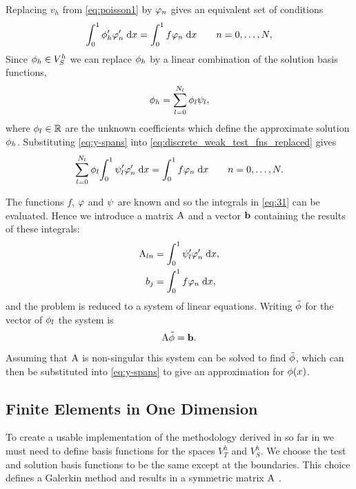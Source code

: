 {Replacing $v_{h}$ from \cref{eq:poisson1} by $\varphi_{n}$ gives an equivalent set of conditions
\begin{equation}
  {\int_0^1   \phi'_{h} \varphi_{n}'   {\; \mathrm{{d}}}{x}}  = {\int_0^1  f\varphi_{n}  {\; \mathrm{{d}}}{x}} \qquad n=0,\ldots,N,
  \label{eq:discrete_weak_test_fns_replaced}
\end{equation}
Since $\phi_{h}\in V_{S}^{h}$ we can replace $\phi_{h}$ by a linear combination of the solution basis functions, \ie
\begin{equation}
  \phi_{h}=\sum_{l=0}^{N_l} \phi_{l}\psi_{l},
  \label{eq:y-spans}
\end{equation}
where $\phi_l \in \mathbb{R}$ are the unknown coefficients which define the approximate solution ${\phi}_h$.
Substituting \cref{eq:y-spans} into \cref{eq:discrete_weak_test_fns_replaced} gives
\begin{equation}
  \sum_{l=0}^{N_l} \phi_{l}{\int_0^1  \psi_{l}'\varphi'_{n}  {\; \mathrm{{d}}}{x}} ={\int_0^1  f\varphi_{n}  {\; \mathrm{{d}}}{x}}
  \qquad n=0,\ldots,N.
  \label{eq:31}
\end{equation}

The functions $f$, $\varphi$ and $\psi$ are known and so the integrals in \cref{eq:31} can be evaluated.
Hence we introduce a matrix $\mathrm{A}$ and a vector ${\boldsymbol{\mathrm{b}}}$ containing the results of these integrals:
\begin{equation}
  \begin{aligned}
    \mathrm{A}_{ln} &= {\int_0^1  \psi_{l}'\varphi'_{n}  {\; \mathrm{{d}}}{x}}, \\
    b_{j} &= {\int_0^1  f\varphi_{n}  {\; \mathrm{{d}}}{x}}, \\
    \label{eq:Aij_bj}
  \end{aligned}
\end{equation}
and the problem is reduced to a system of linear equations.
Writing $\tilde{\phi}$ for the vector of $\phi_l$ the system is
\begin{equation}
  \mathrm{A} \tilde{\phi} = {\boldsymbol{\mathrm{b}}}.
  \label{eq:final_galerkin}
\end{equation}
Assuming that $\mathrm{A}$ is non-singular this system can be solved to find $\tilde{\phi}$, which can then be substituted into \cref{eq:y-spans} to give an approximation for $\phi(x)$.


\subsection{Finite Elements in One Dimension}
\label{sub:Actual-Finite-Elements}

To create a usable implementation of the methodology derived in so far in  we must need to define basis functions for the spaces $V_{T}^{h}$ and $V_S^h$.
We choose the test and solution basis functions to be the same except at the boundaries.
This choice defines a Galerkin method and results in a symmetric matrix $\mathrm{A}$ \cite[215]{Zeinkiewicz1967}.

}

